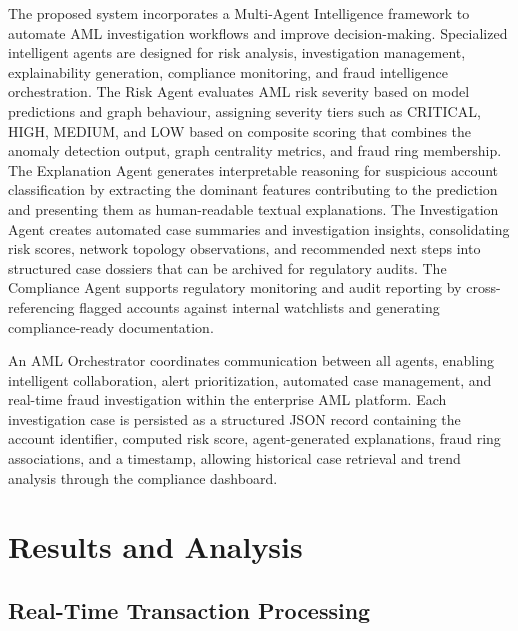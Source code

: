\documentclass[conference]{IEEEtran}
\begin{document}
The proposed system incorporates a Multi-Agent Intelligence framework to automate AML investigation workflows and improve decision-making. Specialized intelligent agents are designed for risk analysis, investigation management, explainability generation, compliance monitoring, and fraud intelligence orchestration. The Risk Agent evaluates AML risk severity based on model predictions and graph behaviour, assigning severity tiers such as CRITICAL, HIGH, MEDIUM, and LOW based on composite scoring that combines the anomaly detection output, graph centrality metrics, and fraud ring membership. The Explanation Agent generates interpretable reasoning for suspicious account classification by extracting the dominant features contributing to the prediction and presenting them as human-readable textual explanations. The Investigation Agent creates automated case summaries and investigation insights, consolidating risk scores, network topology observations, and recommended next steps into structured case dossiers that can be archived for regulatory audits. The Compliance Agent supports regulatory monitoring and audit reporting by cross-referencing flagged accounts against internal watchlists and generating compliance-ready documentation.

An AML Orchestrator coordinates communication between all agents, enabling intelligent collaboration, alert prioritization, automated case management, and real-time fraud investigation within the enterprise AML platform. Each investigation case is persisted as a structured JSON record containing the account identifier, computed risk score, agent-generated explanations, fraud ring associations, and a timestamp, allowing historical case retrieval and trend analysis through the compliance dashboard.

\section{Results and Analysis}

\subsection{Real-Time Transaction Processing}
\end{document}
